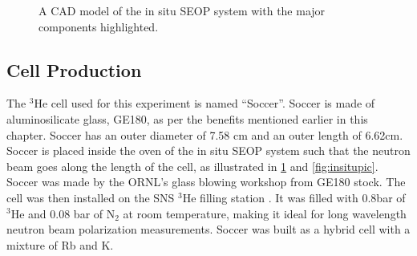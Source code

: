 {\begin{figure}
    \caption{A CAD model of the in situ SEOP system with the major components highlighted.}
    \label{fig:insitumodel}
\end{figure}
\clearpage}


\subsection{Cell Production}

The $^3$He cell used for this experiment is named “Soccer”. Soccer is made of aluminosilicate glass, GE180, as per the benefits mentioned earlier in this chapter. Soccer has an outer diameter of 7.58 cm and an outer length of 6.62cm. Soccer is placed inside the oven of the in situ SEOP system such that the neutron beam goes along the length of the cell, as illustrated in \cref{fig:insitumodel} and \cref{fig:insitupic}. Soccer was made by the ORNL's glass blowing workshop from GE180 stock. The cell was then installed on the SNS $^3$He filling station \cite{Jiang2013}. It was filled with 0.8bar of $^3$He and 0.08 bar of N$_2$ at room temperature, making it ideal for long wavelength neutron beam polarization measurements. Soccer was built as a hybrid cell with a mixture of Rb and K.

